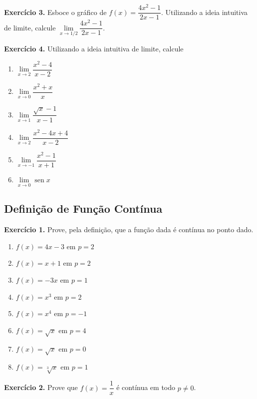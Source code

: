 \documentclass[12pt,a4paper]{article}
\begin{document}
\vspace{0.5cm}
\noindent\textbf{Exercício 3.}
Esboce o gráfico de $f(x) = \dfrac{4x^2 - 1}{2x - 1}$. Utilizando a ideia intuitiva de limite, calcule $\lim\limits_{x \to 1/2} \dfrac{4x^2 - 1}{2x - 1}$.

\vspace{0.5cm}
\noindent\textbf{Exercício 4.} Utilizando a ideia intuitiva de limite, calcule
\begin{enumerate}
    \renewcommand{\theenumi}{\alph{enumi}}
    \renewcommand{\labelenumi}{\theenumi)}
    \item $\lim\limits_{x \to 2} \dfrac{x^2 - 4}{x - 2}$
    \item $\lim\limits_{x \to 0} \dfrac{x^2 + x}{x}$
    \item $\lim\limits_{x \to 1} \dfrac{\sqrt{x} - 1}{x - 1}$
    \item $\lim\limits_{x \to 2} \dfrac{x^2 - 4x + 4}{x - 2}$
    \item $\lim\limits_{x \to -1} \dfrac{x^2 - 1}{x + 1}$
    \item $\lim\limits_{x \to 0} \operatorname{sen} x$
\end{enumerate}

\subsection{Definição de Função Contínua}
\vspace{0.5cm}
\noindent\textbf{Exercício 1.} Prove, pela definição, que a função dada é contínua no ponto dado.
\begin{enumerate}
    \renewcommand{\theenumi}{\alph{enumi}}
    \renewcommand{\labelenumi}{\theenumi)}
    \item $f(x) = 4x - 3$ em $p = 2$
    \item $f(x) = x + 1$ em $p = 2$
    \item $f(x) = -3x$ em $p = 1$
    \item $f(x) = x^3$ em $p = 2$
    \item $f(x) = x^4$ em $p = -1$
    \item $f(x) = \sqrt{x}$ em $p = 4$
    \item $f(x) = \sqrt{x}$ em $p = 0$
    \item $f(x) = \sqrt[3]{x}$ em $p = 1$
\end{enumerate}

\vspace{0.5cm}
\noindent\textbf{Exercício 2.}
Prove que $f(x) = \dfrac{1}{x}$ é contínua em todo $p \neq 0$.
\end{document}
